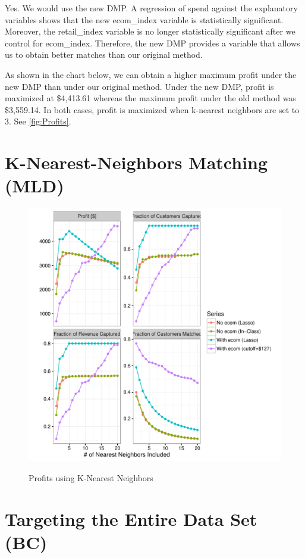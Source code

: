 Yes. We would use the new DMP. A regression of spend against the explanatory variables shows that the new ecom\_index variable is statistically significant. Moreover, the retail\_index variable is no longer statistically significant after we control for ecom\_index. Therefore, the new DMP provides a variable that allows us to obtain better matches than our original method.

As shown in the chart below, we can obtain a higher maximum profit under the new DMP than under our original method. Under the new DMP, profit is maximized at \$4,413.61 whereas the maximum profit under the old method was \$3,559.14. In both cases, profit is maximized when k-nearest neighbors are set to 3. See \vref{fig:Profits}.

\section{K-Nearest-Neighbors Matching (MLD)}

\begin{figure}[!htb]
  \centering
  \caption{Profits using K-Nearest Neighbors}
  \includegraphics[scale=.75]{Profits.pdf}
  \label{fig:Profits}
\end{figure}

\section{Targeting the Entire Data Set (BC)} %



